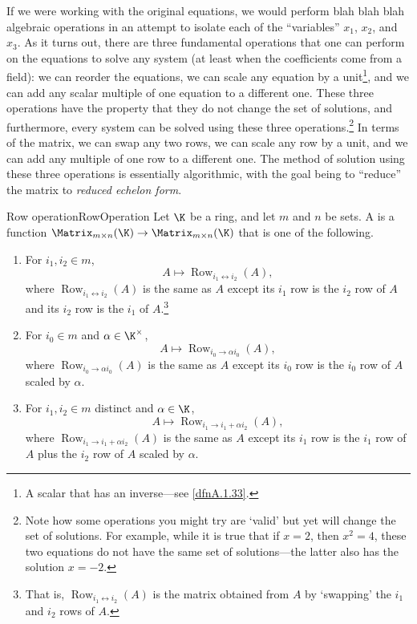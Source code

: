 If we were working with the original equations, we would perform blah blah blah algebraic operations in an attempt to isolate each of the ``variables'' $x_1$, $x_2$, and $x_3$.  As it turns out, there are three fundamental operations that one can perform on the equations to solve any system (at least when the coefficients come from a field):  we can reorder the equations, we can scale any equation by a unit\footnote{A scalar that has an inverse---see \cref{dfnA.1.33}.}, and we can add any scalar multiple of one equation to a different one.  These three operations have the property that they do not change the set of solutions, and furthermore, every system can be solved using these three operations.\footnote{Note how some operations you might try are `valid' but yet will change the set of solutions.  For example, while it is true that if $x=2$, then $x^2=4$, these two equations do not have the same set of solutions---the latter also has the solution $x=-2$.}  In terms of the matrix, we can swap any two rows, we can scale any row by a unit, and we can add any multiple of one row to a different one.  The method of solution using these three operations is essentially algorithmic, with the goal being to ``reduce'' the matrix to \emph{reduced echelon form}.
\begin{dfn}{Row operation}{RowOperation}
	Let $\K$ be a ring, and let $m$ and $n$ be sets.  A  is a function $\Matrix _{m\times n}(\K )\rightarrow \Matrix _{m\times n}(\K )$ that is one of the following.
	\begin{enumerate}
		\item For $i_1,i_2\in m$,
		\begin{equation}
		A\mapsto \operatorname{Row}_{i_1\leftrightarrow i_2}(A),
		\end{equation}
		where $\operatorname{Row}_{i_1\leftrightarrow i_2}(A)$ is the same as $A$ except its $i_1$ row is the $i_2$ row of $A$ and its $i_2$ row is the $i_1$ of $A$.\footnote{That is, $\operatorname{Row}_{i_1\leftrightarrow i_2}(A)$ is the matrix obtained from $A$ by `swapping' the $i_1$ and $i_2$ rows of $A$.}
		\item For $i_0\in m$ and $\alpha \in \K ^{\times}$,
		\begin{equation}
		A\mapsto \operatorname{Row}_{i_0\rightarrow \alpha i_0}(A),
		\end{equation}
		where $\operatorname{Row}_{i_0\rightarrow \alpha i_0}(A)$ is the same as $A$ except its $i_0$ row is the $i_0$ row of $A$ scaled by $\alpha$.
		\item For $i_1,i_2\in m$ distinct and $\alpha \in \K$,
		\begin{equation}
		A\mapsto \operatorname{Row}_{i_1\rightarrow i_1+\alpha i_2}(A),
		\end{equation}
		where $\operatorname{Row}_{i_1\rightarrow i_1+\alpha i_2}(A)$ is the same as $A$ except its $i_1$ row is the $i_1$ row of $A$ plus the $i_2$ row of $A$ scaled by $\alpha$.
	\end{enumerate}
\end{dfn}
